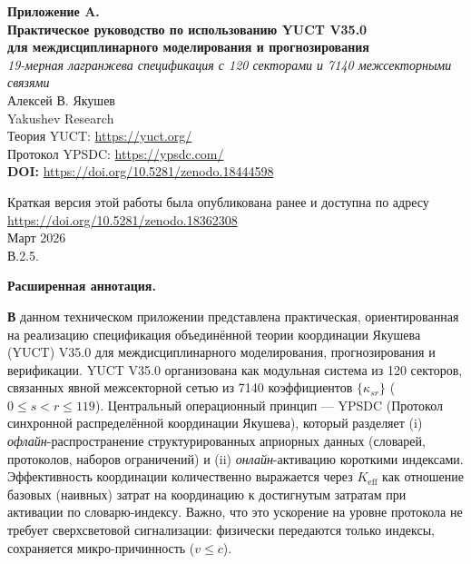 \documentclass[11pt,a4paper]{article}
\newcommand{\Keff}{K_{\mathrm{eff}}}
\begin{document}
	
	\begin{titlepage}
		\begin{center}
			\vspace*{0.2cm}
			{\Huge\textbf{Приложение A. \\[0.3cm]
					Практическое руководство по использованию YUCT V35.0\\[0.3cm]
					для междисциплинарного моделирования и прогнозирования}}\\[0.8cm]
			
			{\Large\textit{19-мерная лагранжева спецификация с 120 секторами и 7140 межсекторными связями}}\\[1.2cm]
			
			{\Large Алексей В. Якушев}\\[0.3cm]
			{\large Yakushev Research}\\
			Теория YUCT: \url{https://yuct.org/}\\
			Протокол YPSDC: \url{https://ypsdc.com/}\\
			
			\vspace{2cm}
			\textbf{DOI:} \url{https://doi.org/10.5281/zenodo.18444598}\\
			
			\vspace{1cm}
			
			\large 
			Краткая версия этой работы была опубликована ранее и доступна по адресу\\ \url{https://doi.org/10.5281/zenodo.18362308}\\
			\vspace{1cm}
			Март 2026 \\ \large В.2.5.
			
			\begin{minipage}{0.92\textwidth}
				\begin{center}\large\textbf{Расширенная аннотация.} \\
				\end{center}
				\large\textbf В данном техническом приложении представлена практическая, ориентированная на реализацию спецификация объединённой теории координации Якушева (YUCT) V35.0 для междисциплинарного моделирования, прогнозирования и верификации. YUCT V35.0 организована как модульная система из 120 секторов, связанных явной межсекторной сетью из 7140 коэффициентов $\{\kappa_{sr}\}$ ($0\le s<r\le 119$). Центральный операционный принцип — YPSDC (Протокол синхронной распределённой координации Якушева), который разделяет (i) \emph{офлайн}-распространение структурированных априорных данных (словарей, протоколов, наборов ограничений) и (ii) \emph{онлайн}-активацию короткими индексами. Эффективность координации количественно выражается через $\Keff$ как отношение базовых (наивных) затрат на координацию к достигнутым затратам при активации по словарю-индексу. Важно, что это ускорение на уровне протокола не требует сверхсветовой сигнализации: физически передаются только индексы, сохраняется микро-причинность ($v\le c$).
				

\end{minipage}
\end{center}
\end{titlepage}
\end{document}
